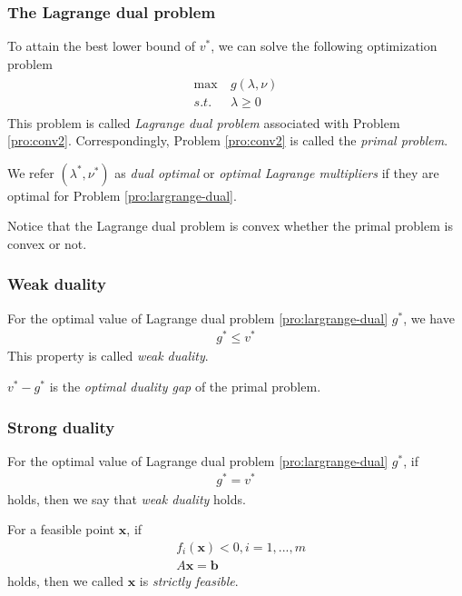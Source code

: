 \subsubsection{The Lagrange dual problem}
To attain the best lower bound of $v^*$,
we can solve the following optimization problem
\begin{align}
    \begin{array}{ll}
        \max \ &g(\lambda, \nu) \\
        s.t. \ &\lambda \geq 0
    \end{array}
    \label{pro:largrange-dual}
\end{align}
This problem is called \emph{Lagrange dual problem}
associated with Problem \ref{pro:conv2}.
Correspondingly, Problem \ref{pro:conv2}
is called the \emph{primal problem}.
\par
We refer $(\lambda^*, \nu^*)$ as \emph{dual optimal}
or \emph{optimal Lagrange multipliers} if they are
optimal for Problem \ref{pro:largrange-dual}.
\par
Notice that the Lagrange dual problem is convex
whether the primal problem is convex or not.

\subsubsection{Weak duality}
For the optimal value of Lagrange dual
problem \ref{pro:largrange-dual} $g^*$,
we have
\begin{align}
    g^* \leq v^*
\end{align}
This property is called \emph{weak duality}.
\par
$v^* - g^*$ is the \emph{optimal duality gap}
of the primal problem.

\subsubsection{Strong duality}
For the optimal value of Lagrange dual
problem \ref{pro:largrange-dual} $g^*$,
if
\begin{align}
    g^* = v^*
\end{align}
holds, then we say that \emph{weak duality} holds.

\begin{definition}
    For a feasible point $\mathbf{x}$, if
    \begin{align}
        &f_i(\mathbf{x}) < 0, i = 1,..., m \\
        &A\mathbf{x} = \mathbf{b}
    \end{align}
    holds, then we called $\mathbf{x}$ is
    \emph{strictly feasible}.
\end{definition}

